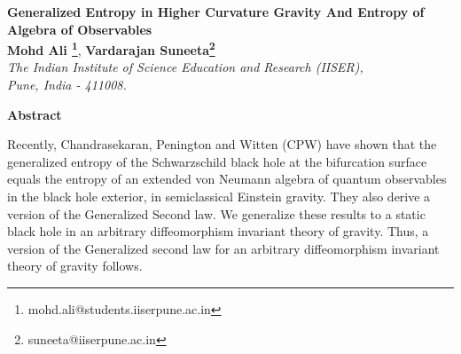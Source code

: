 \documentclass[12pt]{article}
\begin{document}
\begin{center}
\vspace{24pt} { \large \bf Generalized Entropy in Higher Curvature Gravity And Entropy of Algebra of Observables} \\
\vspace{30pt}
%
\vspace{30pt}
%
\vspace{30pt}
%
{\bf Mohd Ali \footnote{mohd.ali@students.iiserpune.ac.in}}, {\bf Vardarajan
Suneeta\footnote{suneeta@iiserpune.ac.in}}\\
%
\vspace{24pt} %
{\em  The Indian Institute of Science Education and Research (IISER),\\
Pune, India - 411008.}
%
\end{center}
\date{\today}
\bigskip
\begin{center}
{\bf Abstract}
\end{center}

Recently, Chandrasekaran, Penington and Witten (CPW) have shown that the generalized entropy of the Schwarzschild black hole at the bifurcation surface equals the entropy of an extended von Neumann algebra of quantum observables in the black hole exterior, in semiclassical Einstein gravity. They also derive a version of the Generalized Second law. We generalize these results to a static black hole in an arbitrary diffeomorphism invariant theory of gravity. Thus, a version of the Generalized second law for an arbitrary diffeomorphism invariant theory of gravity follows.
\newpage
\end{document}
